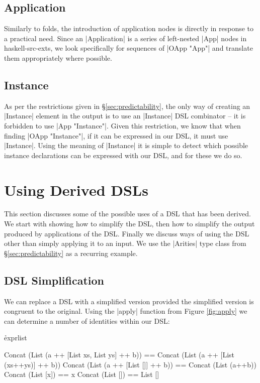 \documentclass[preprint,draft]{sigplanconf}
\begin{document}
\subsection{Application}

Similarly to folds, the introduction of application nodes is directly in response to a practical need. Since an |Application| is a series of left-nested |App| nodes in haskell-src-exts, we look specifically for sequences of |OApp "App"| and translate them appropriately where possible.

\subsection{Instance}

As per the restrictions given in \S\ref{sec:predictability}, the only way of creating an |Instance| element in the output is to use an |Instance| DSL combinator -- it is forbidden to use |App "Instance"|. Given this restriction, we know that when finding |OApp "Instance"|, if it can be expressed in our DSL, it must use |Instance|. Using the meaning of |Instance| it is simple to detect which possible instance declarations can be expressed with our DSL, and for these we do so.

\section{Using Derived DSLs}
\label{sec:using}

This section discusses some of the possible uses of a DSL that has been derived. We start with showing how to simplify the DSL, then how to simplify the output produced by applications of the DSL. Finally we discuss ways of using the DSL other than simply applying it to an input. We use the |Arities| type class from \S\ref{sec:predictability} as a recurring example.

\subsection{DSL Simplification}
\label{sec:dsl_simplify}

We can replace a DSL with a simplified version provided the simplified version is congruent to the original. Using the |apply| function from Figure \ref{fig:apply} we can determine a number of identities within our DSL:

\h{exprlist}\begin{code}
Concat (List (a ++ [List xs, List ys] ++ b)) ==
    Concat (List (a ++ [List (xs++ys)] ++ b))
Concat (List (a ++ [List []] ++ b)) == Concat (List (a++b))
Concat (List [x]) == x
Concat (List []) == List []
\end{code}
\end{document}
